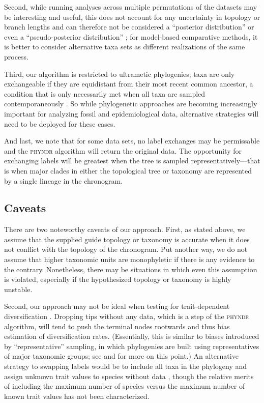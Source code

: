 \documentclass[a4paper,11pt]{article}
\begin{document}
Second, while running analyses across multiple permutations of the datasets may be interesting and useful, this does not account for any uncertainty in topology or branch lengths and can therefore not be considered a ``posterior distribution'' or even a ``pseudo-posterior distribution'' \citep[\emph{sensu}][]{ThomasPastis, Rabosky2015}; for model-based comparative methods, it is better to consider alternative taxa sets as different realizations of the same process. 

Third, our algorithm is restricted to ultrametic phylogenies; taxa are only exchangeable if they are equidistant from their most recent common ancestor, a condition that is only necessarily met when all taxa are sampled contemporaneously \citep[see][for more discussion of this point and its implications for models of trait evolution]{SlaterMEE}. So while phylogenetic approaches are becoming increasingly important for analyzing fossil and epidemiological data, alternative strategies will need to be deployed for these cases.

And last, we note that for some data sets, no label exchanges may be permissable and the \textsc{phyndr} algorithm will return the original data. The opportunity for exchanging labels will be greatest when the tree is sampled representatively---that is when major clades in either the topological tree or taxonomy are represented by a single lineage in the chronogram.

\subsection{Caveats}

There are two noteworthy caveats of our approach. First, as stated above, we assume that the supplied guide topology or taxonomy is accurate when it does not conflict with the topology of the chronogram. Put another way, we do not assume that higher taxonomic units are monophyletic if there is any evidence to the contrary. Nonetheless, there may be situations in which even this assumption is violated, especially if the hypothesized topology or taxonomy is highly unstable. 

Second, our approach may not be ideal when testing for trait-dependent diversification \citep[e.g.,][]{Maddison2007, FitzJohn2012}. Dropping tips without any data, which is a step of the \textsc{phyndr} algorithm, will tend to push the terminal nodes rootwards and thus bias estimation of diversification rates. (Essentially, this is similar to biases introduced by ``representative'' sampling, in which phylogenies are built using representatives of major taxonomic groups; see \citealt{Hohna2011} and \citealt{Stadler2013} for more on this point.) An alternative strategy to swapping labels would be to include all taxa in the phylogeny and assign unknown trait values to species without data \citep{FitzJohn2009}, though the relative merits of including the maximum number of species versus the maximum number of known trait values has not been characterized.
\end{document}
